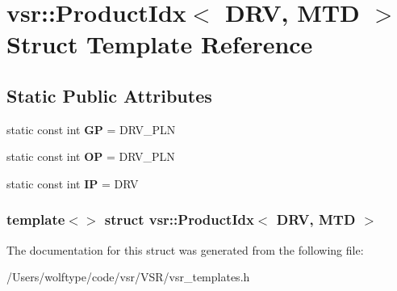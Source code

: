 \hypertarget{structvsr_1_1_product_idx_3_01_d_r_v_00_01_m_t_d_01_4}{\section{vsr\-:\-:Product\-Idx$<$ D\-R\-V, M\-T\-D $>$ Struct Template Reference}
\label{structvsr_1_1_product_idx_3_01_d_r_v_00_01_m_t_d_01_4}
}
\subsection*{Static Public Attributes}
\begin{DoxyCompactItemize}
\item 
\hypertarget{structvsr_1_1_product_idx_3_01_d_r_v_00_01_m_t_d_01_4_a08fd07e17f959fd05d09f530fa6bc45e}{static const int {\bfseries G\-P} = D\-R\-V\-\_\-\-P\-L\-N}\label{structvsr_1_1_product_idx_3_01_d_r_v_00_01_m_t_d_01_4_a08fd07e17f959fd05d09f530fa6bc45e}

\item 
\hypertarget{structvsr_1_1_product_idx_3_01_d_r_v_00_01_m_t_d_01_4_a7d29939165f4619100a2da2bdf012032}{static const int {\bfseries O\-P} = D\-R\-V\-\_\-\-P\-L\-N}\label{structvsr_1_1_product_idx_3_01_d_r_v_00_01_m_t_d_01_4_a7d29939165f4619100a2da2bdf012032}

\item 
\hypertarget{structvsr_1_1_product_idx_3_01_d_r_v_00_01_m_t_d_01_4_a3e0f5095ccda29cb864f039063f89bf1}{static const int {\bfseries I\-P} = D\-R\-V}\label{structvsr_1_1_product_idx_3_01_d_r_v_00_01_m_t_d_01_4_a3e0f5095ccda29cb864f039063f89bf1}

\end{DoxyCompactItemize}
\subsubsection*{template$<$$>$ struct vsr\-::\-Product\-Idx$<$ D\-R\-V, M\-T\-D $>$}



The documentation for this struct was generated from the following file\-:\begin{DoxyCompactItemize}
\item 
/\-Users/wolftype/code/vsr/\-V\-S\-R/vsr\-\_\-templates.\-h\end{DoxyCompactItemize}
